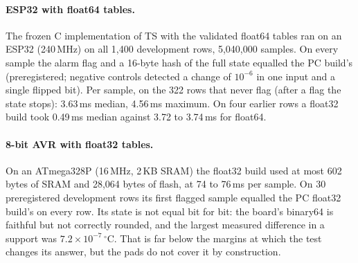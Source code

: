 \documentclass[11pt,a4paper]{article}
\newcommand{\degC}{\ensuremath{{}^\circ}C}
\newcommand{\sci}[2]{\ensuremath{#1\times10^{#2}}}
\begin{document}
\paragraph{ESP32 with float64 tables.} The frozen C implementation of TS with the validated float64 tables ran on an ESP32
(240\,MHz) on all 1,400 development rows, 5,040,000 samples. On every sample the alarm flag and a 16-byte hash of the
full state equalled the PC build's (preregistered; negative controls detected a change of $10^{-6}$ in one input and a
single flipped bit). Per sample, on the 322 rows that never flag (after a flag the state stops): 3.63\,ms median,
4.56\,ms maximum. On four earlier rows a float32 build took 0.49\,ms median against 3.72 to 3.74\,ms for float64.

\paragraph{8-bit AVR with float32 tables.} On an ATmega328P (16\,MHz, 2\,KB SRAM) the float32 build used at most 602
bytes of SRAM and 28,064 bytes of flash, at 74 to 76\,ms per sample. On 30 preregistered development rows its first
flagged sample equalled the PC float32 build's on every row. Its state is not equal bit for bit: the board's binary64
is faithful but not correctly rounded, and the largest measured difference in a support was \sci{7.2}{-7}\,\degC. That
is far below the margins at which the test changes its answer, but the pads do not cover it by construction.
\end{document}

